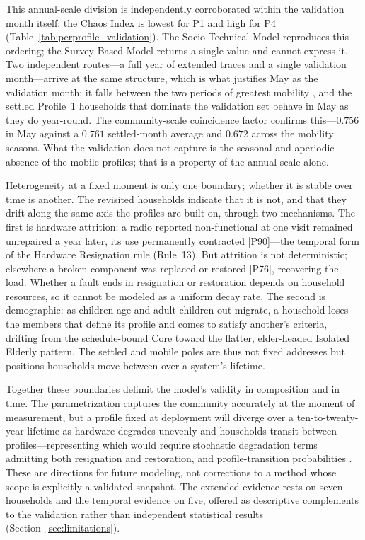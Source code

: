 \documentclass[final,3p,times,onecolumn]{elsarticle}
\begin{document}
This annual-scale division is independently corroborated within the validation month itself: the Chaos Index is lowest for P1 and high for P4
(Table~\ref{tab:perprofile_validation}). The Socio-Technical Model reproduces this ordering; the Survey-Based Model returns a single value and cannot express it. Two independent routes---a full year of extended traces and a single validation month---arrive at the same structure, which is what justifies May as the validation month: it falls between the two periods of greatest mobility \citep{gaioc_del_territorio_de_raqaypampa_plan_2018}, and the settled Profile~1 households that dominate the validation set behave in May as they do year-round. The community-scale coincidence factor confirms this---$0.756$ in May against a $0.761$ settled-month average and $0.672$ across the mobility seasons. What the validation does not capture is the seasonal and aperiodic absence of the mobile profiles; that is a property of the annual scale alone.

Heterogeneity at a fixed moment is only one boundary; whether it is stable over time is another. The revisited households indicate that it is not, and that they drift along the same axis the profiles are built on, through two mechanisms. The first is hardware attrition: a radio reported non-functional at one visit remained unrepaired a year later, its use permanently contracted [P90]---the temporal form of the Hardware Resignation rule (Rule~13). But attrition is not deterministic; elsewhere a broken component was replaced or restored [P76], recovering the load. Whether a fault ends in resignation or restoration depends on household resources, so it cannot be modeled as a uniform decay rate. The second is demographic: as children age and adult children out-migrate, a household loses the members that define its profile and comes to satisfy another's criteria, drifting from the schedule-bound Core toward the flatter, elder-headed Isolated Elderly pattern. The settled and mobile poles are thus not fixed addresses but positions households move between over a system's lifetime.

Together these boundaries delimit the model's validity in composition and in time. The parametrization captures the community accurately at the moment of measurement, but a profile fixed at deployment will diverge over a ten-to-twenty-year lifetime as hardware degrades unevenly and households transit between profiles---representing which would require stochastic degradation terms admitting both resignation and restoration, and profile-transition probabilities \citep{XXX}. These are directions for future modeling, not corrections to a method whose scope is explicitly a validated snapshot. The extended evidence rests on seven households and the temporal evidence on five, offered as descriptive complements to the validation rather than independent statistical results (Section~\ref{sec:limitations}).
\end{document}
